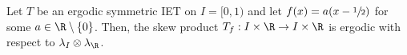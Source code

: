 \begin{theorem}\label{thm: ergo}
Let $T$ be an ergodic symmetric IET on $I = [0, 1)$ and let $f(x)=a(x-\sfrac{1}{2})$ for some $a\in\R\setminus\{0\}$. Then, the skew product $T_f:I\times\R\to I\times \R$ is ergodic with respect to $\lambda_I\otimes\lambda_{\R}$.
\end{theorem}
